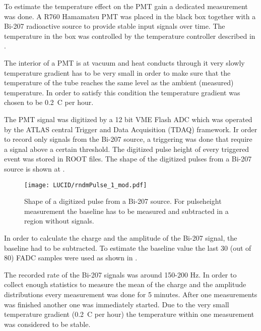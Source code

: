 To estimate the temperature effect on the PMT gain a dedicated measurement was done. 
A R760 Hamamatsu PMT was placed in the black box together with a Bi-207 radioactive source
to provide stable input signals over time. The temperature in the box was controlled by the temperature controller described in 
.

The interior of a PMT is at vacuum and heat conducts through it very slowly temperature gradient has to be very small in order to make sure 
that the temperature of the tube reaches the same level as the ambient (measured) temperature.
In order to satisfy this condition the temperature gradient was chosen to be 0.2\degree~C per hour.

The PMT signal was digitized by a 12 bit VME Flash ADC which was operated by the ATLAS central Trigger and Data Acquisition (TDAQ) framework.
Ir order to record only signals from the Bi-207 source, a triggering was done that require a signal above a certain threshold.
The digitized pulse height of every triggered event was stored in ROOT files.
The shape of the digitized pulses from a Bi-207 source is shown at . 

\begin{figure}
\centering
\texttt{[image: LUCID/rndmPulse\_1\_mod.pdf]}
\caption{Shape of a digitized pulse from a Bi-207 source. For pulseheight measurement the baseline has to be measured and subtracted in a region without signals.}
\label{fig:bi207DigitizedPulse}
\end{figure}

In order to calculate the charge and the amplitude of the Bi-207 signal, the baseline had to be subtracted. 
To estimate the baseline value the last 30 (out of 80) FADC samples were used as shown in .

The recorded rate of the Bi-207 signals was around 150-200 Hz. In order to collect enough statistics to measure the mean of the charge and 
the amplitude distributions every measurement was done for 5 minutes. 
After one measurements was finished another one was immediately started.
Due to the very small temperature gradient (0.2\degree~C per hour) the temperature within one measurement was considered to be stable.

